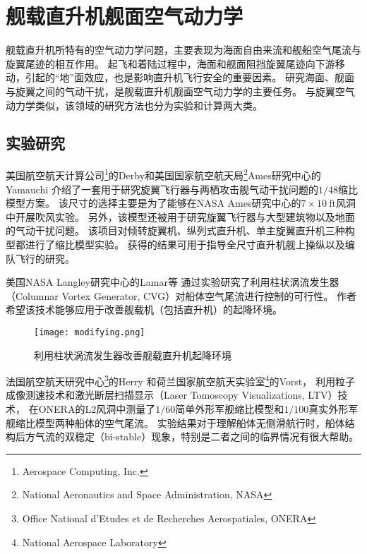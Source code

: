 
\section{舰载直升机舰面空气动力学}
舰载直升机所特有的空气动力学问题，主要表现为海面自由来流和舰船空气尾流与旋翼尾迹的相互作用。
起飞和着陆过程中，海面和舰面阻挡旋翼尾迹向下游移动，引起的“地”面效应，也是影响直升机飞行安全的重要因素。
研究海面、舰面与旋翼之间的气动干扰，是舰载直升机舰面空气动力学的主要任务。
与旋翼空气动力学类似，该领域的研究方法也分为实验和计算两大类。

\subsection{实验研究}
美国航空航天计算公司\footnote{Aerospace Computing, Inc.}的Derby和美国国家航空航天局\footnote{National Aeronautics and Space Administration, NASA}Ames研究中心的Yamauchi
介绍了一套用于研究旋翼飞行器与两栖攻击舰气动干扰问题的$1/48$缩比模型方案。
该尺寸的选择主要是为了能够在NASA Ames研究中心的$7\times10~\mathrm{ft}$风洞中开展吹风实验。
另外，该模型还被用于研究旋翼飞行器与大型建筑物以及地面的气动干扰问题。
该项目对倾转旋翼机、纵列式直升机、单主旋翼直升机三种构型都进行了缩比模型实验。
获得的结果可用于指导全尺寸直升机舰上操纵以及编队飞行的研究。

美国NASA Langley研究中心的Lamar等
通过实验研究了利用柱状涡流发生器（Columnar Vortex Generator, CVG）对船体空气尾流进行控制的可行性。
作者希望该技术能够应用于改善舰载机（包括直升机）的起降环境。
\begin{figure}[t!]
    \centering
    \texttt{[image: modifying.png]}
    \caption{利用柱状涡流发生器改善舰载直升机起降环境}
\end{figure}

法国航空航天研究中心\footnote{Office National d'Etudes et de Recherches Aerospatiales, ONERA}的Herry
和荷兰国家航空航天实验室\footnote{National Aerospace Laboratory}的Vorst，
利用粒子成像测速技术和激光断层扫描显示（Laser Tomoscopy Visualizations, LTV）技术，
在ONERA的L2风洞中测量了$1/60$简单外形军舰缩比模型和$1/100$真实外形军舰缩比模型两种船体的空气尾流。
实验结果对于理解船体无侧滑航行时，船体结构后方气流的双稳定（bi-stable）现象，特别是二者之间的临界情况有很大帮助。

